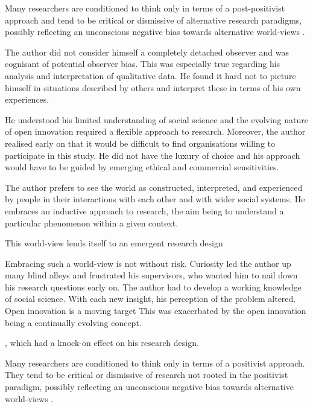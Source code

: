 Many researchers are conditioned to think only in terms of a post-positivist approach and tend to be critical or dismissive of alternative research paradigms, possibly reflecting an unconscious negative bias towards alternative world-views \citep{staller2013epistemological}.  

The author did not consider himself a completely detached observer and was cognisant of potential observer bias. This was especially true regarding his analysis and interpretation of qualitative data. He found it hard not to picture himself in situations described by others and interpret these in terms of his own experiences. 


He understood his limited understanding of social science and the evolving nature of open innovation required a flexible approach to research. Moreover, the author realised early on that it would be difficult to find organisations willing to participate in this study. He did not have the luxury of choice and his approach would have to be guided by emerging ethical and commercial sensitivities.

The author prefers to see the world as constructed, interpreted, and experienced by people in their interactions with each other and with wider social systems. He embraces an inductive approach to research, the aim being to understand a particular phenomenon within a given context. 

This world-view lends itself to an emergent research design

Embracing such a world-view is not without risk. Curiosity led the author up many blind alleys and frustrated his supervisors, who wanted him to nail down his research questions early on. The author had to develop a working knowledge of social science. With each new insight, his perception of the problem altered. Open innovation is a moving target This was exacerbated by the open innovation being a continually evolving concept.

, which had a knock-on effect on his research design.


Many researchers are conditioned to think only in terms of a positivist approach. They tend to be critical or dismissive of research not rooted in the positivist paradigm, possibly reflecting an unconscious negative bias towards alternative world-views \citep{staller2013epistemological}.  

